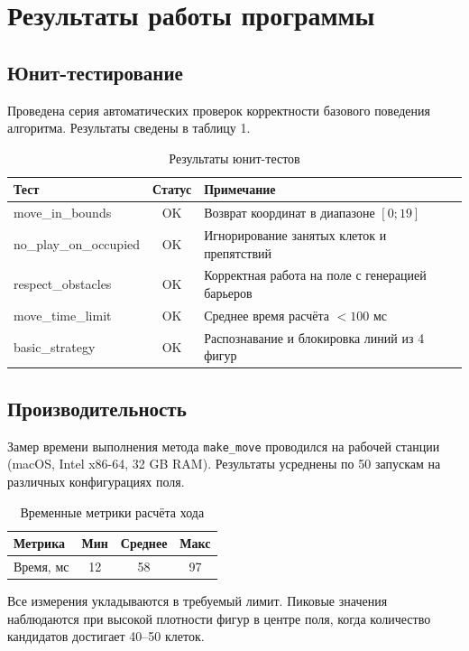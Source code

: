 \documentclass[12pt,a4paper]{article}
\begin{document}
\section{Результаты работы программы}

\subsection{Юнит-тестирование}
Проведена серия автоматических проверок корректности базового поведения алгоритма. Результаты сведены в таблицу 1.

\begin{table}[h]
\centering
\caption{Результаты юнит-тестов}
\begin{tabular}{|l|c|l|}
\hline
\textbf{Тест} & \textbf{Статус} & \textbf{Примечание} \\ \hline
move\_in\_bounds & OK & Возврат координат в диапазоне $[0; 19]$ \\ \hline
no\_play\_on\_occupied & OK & Игнорирование занятых клеток и препятствий \\ \hline
respect\_obstacles & OK & Корректная работа на поле с генерацией барьеров \\ \hline
move\_time\_limit & OK & Среднее время расчёта $< 100$ мс \\ \hline
basic\_strategy & OK & Распознавание и блокировка линий из 4 фигур \\ \hline
\end{tabular}
\end{table}

\subsection{Производительность}
Замер времени выполнения метода \texttt{make\_move} проводился на рабочей станции (macOS, Intel x86-64, 32 GB RAM). Результаты усреднены по 50 запускам на различных конфигурациях поля.

\begin{table}[h]
\centering
\caption{Временные метрики расчёта хода}
\begin{tabular}{|l|c|c|c|}
\hline
\textbf{Метрика} & \textbf{Мин} & \textbf{Среднее} & \textbf{Макс} \\ \hline
Время, мс & 12 & 58 & 97 \\ \hline
\end{tabular}
\end{table}
Все измерения укладываются в требуемый лимит. Пиковые значения наблюдаются при высокой плотности фигур в центре поля, когда количество кандидатов достигает 40--50 клеток.
\end{document}
